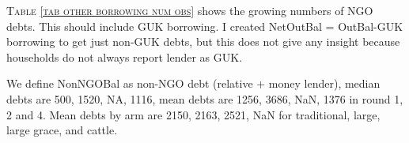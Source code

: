 \textsc{\footnotesize Table \ref{tab other borrowing num obs}} shows the growing numbers of NGO debts. This should include GUK borrowing. I created \textsf{NetOutBal} = \textsf{OutBal}-GUK borrowing to get just non-GUK debts, but this does not give any insight because households do not always report lender as GUK. 



We define \textsf{NonNGOBal} as non-NGO debt (relative + money lender), median debts are 
500, 
1520, 
NA, 
1116,
mean debts are 
1256, 
3686, 
NaN, 
1376 in round 1, 2 and 4.
Mean debts by arm are 
2150, 
2163, 
2521, 
NaN for traditional, large, large grace, and cattle. 

\vspace{2ex}

